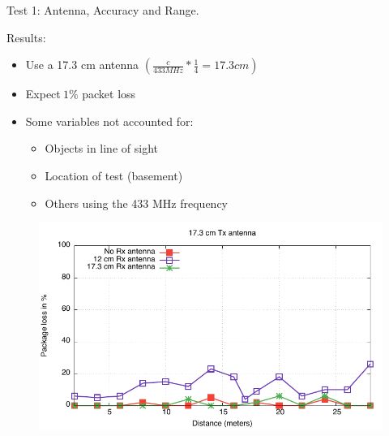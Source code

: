 \begin{frame}{Test 1: Antenna, Accuracy and Range.}
    \begin{block}{Results:}
        \begin{itemize}
            \item Use a \textcolor{ReneOrange}{17.3 cm antenna} $(\frac{c}{433 MHz} * \frac{1}{4} = 17.3 cm)$
            \item Expect\textcolor{ReneOrange}{$~1 \%$ packet loss} 
            \item Some variables not accounted for:
            \begin{itemize}
                \item Objects in line of sight
                \item Location of test (basement)
                \item Others using the 433 MHz frequency
            \end{itemize}
        \end{itemize}
    \end{block}
    
    \begin{figure}
        \includegraphics[height=0.4\textheight,keepaspectratio]{figures/17cm_ant.pdf}
    \end{figure}
\end{frame}


